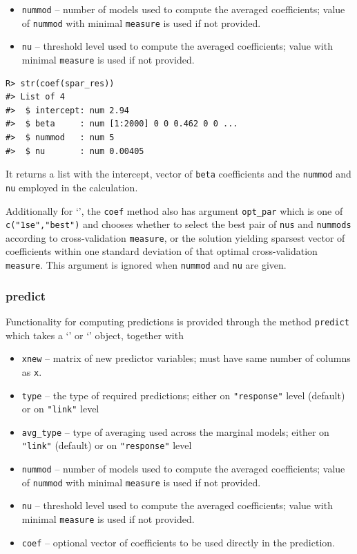 \documentclass[
  article,
  nojss]{jss}
\newcommand{\class}[1]{`\code{#1}'}
\begin{document}
\begin{itemize}
\item
  \texttt{nummod} -- number of models used to compute the averaged
  coefficients; value of \texttt{nummod} with minimal \texttt{measure}
  is used if not provided.
\item
  \texttt{nu} -- threshold level used to compute the averaged
  coefficients; value with minimal \texttt{measure} is used if not
  provided.
\end{itemize}

\begin{verbatim}
R> str(coef(spar_res))
#> List of 4
#>  $ intercept: num 2.94
#>  $ beta     : num [1:2000] 0 0 0.462 0 0 ...
#>  $ nummod   : num 5
#>  $ nu       : num 0.00405
\end{verbatim}

It returns a list with the intercept, vector of \texttt{beta}
coefficients and the \texttt{nummod} and \texttt{nu} employed in the
calculation.

Additionally for \class{spar.cv}, the \texttt{coef} method also has
argument \texttt{opt\_par} which is one of \texttt{c("1se","best")} and
chooses whether to select the best pair of \texttt{nus} and
\texttt{nummods} according to cross-validation \texttt{measure}, or the
solution yielding sparsest vector of coefficients within one standard
deviation of that optimal cross-validation \texttt{measure}. This
argument is ignored when \texttt{nummod} and \texttt{nu} are given.

\subsubsection{predict}\label{predict}

Functionality for computing predictions is provided through the method
\texttt{predict} which takes a \class{spar} or \class{spar.cv} object,
together with

\begin{itemize}
\item
  \texttt{xnew} -- matrix of new predictor variables; must have same
  number of columns as \texttt{x}.
\item
  \texttt{type} -- the type of required predictions; either on
  \texttt{"response"} level (default) or on \texttt{"link"} level
\item
  \texttt{avg\_type} -- type of averaging used across the marginal
  models; either on \texttt{"link"} (default) or on \texttt{"response"}
  level
\item
  \texttt{nummod} -- number of models used to compute the averaged
  coefficients; value of \texttt{nummod} with minimal \texttt{measure}
  is used if not provided.
\item
  \texttt{nu} -- threshold level used to compute the averaged
  coefficients; value with minimal \texttt{measure} is used if not
  provided.
\item
  \texttt{coef} -- optional vector of coefficients to be used directly
  in the prediction.
\end{itemize}
\end{document}
